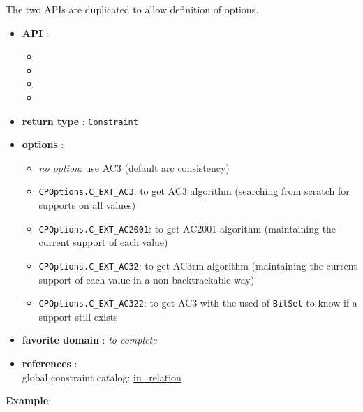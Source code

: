The two APIs are duplicated to allow definition of options. 
\begin{itemize}
	\item \textbf{API} :
	\begin{itemize}
		\item {}
		\item {}
		\item {}
		\item {}
	\end{itemize}
	\item \textbf{return type} : \texttt{Constraint}
	\item \textbf{options} :
	\begin{itemize}
		\item \emph{no option}: use AC3 (default arc consistency)
		\item \texttt{CPOptions.C_EXT_AC3}: to get AC3 algorithm (searching from scratch for supports on all values)
		\item \texttt{CPOptions.C_EXT_AC2001}: to get AC2001 algorithm (maintaining the current support of each value)
		\item \texttt{CPOptions.C_EXT_AC32}: to get AC3rm algorithm (maintaining the current support of each value in a non backtrackable way)
		\item \texttt{CPOptions.C_EXT_AC322}: to get AC3 with the used of \texttt{BitSet} to know if a support still exists
	\end{itemize}
	\item \textbf{favorite domain} : \emph{to complete}
	\item \textbf{references} :\\
      global constraint catalog: \href{http://www.emn.fr/x-info/sdemasse/gccat/Cin_relation.html}{in\_relation}
\end{itemize}



\textbf{Example}:
 
